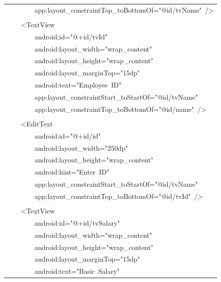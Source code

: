 \documentclass[a4paper,12pt]{article}
\begin{document}
\begin{longtable}{|p{}|}
{\ttfamily\small \ \ \ \ \ \ \ \ app:layout\_constraintTop\_toBottomOf="@id/tvName"\ /\textgreater{}} \\
\strut \\
{\ttfamily\small \ \ \ \ \textless{}TextView} \\
{\ttfamily\small \ \ \ \ \ \ \ \ android:id="@+id/tvId"} \\
{\ttfamily\small \ \ \ \ \ \ \ \ android:layout\_width="wrap\_content"} \\
{\ttfamily\small \ \ \ \ \ \ \ \ android:layout\_height="wrap\_content"} \\
{\ttfamily\small \ \ \ \ \ \ \ \ android:layout\_marginTop="15dp"} \\
{\ttfamily\small \ \ \ \ \ \ \ \ android:text="Employee\ ID"} \\
{\ttfamily\small \ \ \ \ \ \ \ \ app:layout\_constraintStart\_toStartOf="@id/tvName"} \\
{\ttfamily\small \ \ \ \ \ \ \ \ app:layout\_constraintTop\_toBottomOf="@id/name"\ /\textgreater{}} \\
\strut \\
{\ttfamily\small \ \ \ \ \textless{}EditText} \\
{\ttfamily\small \ \ \ \ \ \ \ \ android:id="@+id/id"} \\
{\ttfamily\small \ \ \ \ \ \ \ \ android:layout\_width="250dp"} \\
{\ttfamily\small \ \ \ \ \ \ \ \ android:layout\_height="wrap\_content"} \\
{\ttfamily\small \ \ \ \ \ \ \ \ android:hint="Enter\ ID"} \\
{\ttfamily\small \ \ \ \ \ \ \ \ app:layout\_constraintStart\_toStartOf="@id/tvName"} \\
{\ttfamily\small \ \ \ \ \ \ \ \ app:layout\_constraintTop\_toBottomOf="@id/tvId"\ /\textgreater{}} \\
\strut \\
{\ttfamily\small \ \ \ \ \textless{}TextView} \\
{\ttfamily\small \ \ \ \ \ \ \ \ android:id="@+id/tvSalary"} \\
{\ttfamily\small \ \ \ \ \ \ \ \ android:layout\_width="wrap\_content"} \\
{\ttfamily\small \ \ \ \ \ \ \ \ android:layout\_height="wrap\_content"} \\
{\ttfamily\small \ \ \ \ \ \ \ \ android:layout\_marginTop="15dp"} \\
{\ttfamily\small \ \ \ \ \ \ \ \ android:text="Basic\ Salary"} \\

\end{longtable}
\end{document}
